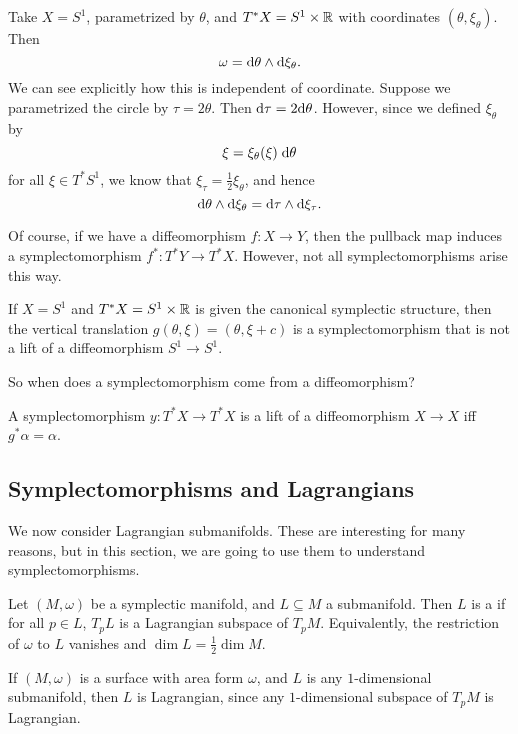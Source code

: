 \documentclass[a4paper]{article}
\begin{document}
\begin{eg}
  Take $X = S^1$, parametrized by $\theta$, and $T^* X = S^1 \times \mathbb{R}$ with coordinates $(\theta, \xi_\theta)$. Then
  \[
    \omega = \mathrm{d} \theta \wedge \mathrm{d} \xi_\theta.
  \]
  We can see explicitly how this is independent of coordinate. Suppose we parametrized the circle by $\tau = 2 \theta$. Then $\mathrm{d} \tau = 2 \mathrm{d} \theta$. However, since we defined $\xi_\theta$ by
  \[
    \xi = \xi_\theta(\xi) \;\mathrm{d} \theta
  \]
  for all $\xi \in T^* S^1$, we know that $\xi_\tau = \frac{1}{2} \xi_\theta$, and hence
  \[
    \mathrm{d} \theta \wedge \mathrm{d} \xi_\theta = \mathrm{d} \tau \wedge \mathrm{d} \xi_\tau.
  \]
\end{eg}

Of course, if we have a diffeomorphism $f: X \to Y$, then the pullback map induces a symplectomorphism $f^*: T^*Y \to T^*X$. However, not all symplectomorphisms arise this way.
\begin{eg}
  If $X = S^1$ and $T^* X = S^1 \times \mathbb{R}$ is given the canonical symplectic structure, then the vertical translation $g(\theta, \xi) = (\theta, \xi + c)$ is a symplectomorphism that is not a lift of a diffeomorphism $S^1 \to S^1$.
\end{eg}

So when does a symplectomorphism come from a diffeomorphism?

\begin{ex}
  A symplectomorphism $y: T^* X \to T^* X$ is a lift of a diffeomorphism $X \to X$ iff $g^* \alpha = \alpha$.
\end{ex}

\subsection{Symplectomorphisms and Lagrangians}
We now consider Lagrangian submanifolds. These are interesting for many reasons, but in this section, we are going to use them to understand symplectomorphisms.
\begin{defi}
  Let $(M, \omega)$ be a symplectic manifold, and $L \subseteq M$ a submanifold. Then $L$ is a  if for all $p \in L$, $T_p L$ is a Lagrangian subspace of $T_p M$. Equivalently, the restriction of $\omega$ to $L$ vanishes and $\dim L = \frac{1}{2} \dim M$.
\end{defi}

\begin{eg}
  If $(M, \omega)$ is a surface with area form $\omega$, and $L$ is any $1$-dimensional submanifold, then $L$ is Lagrangian, since any $1$-dimensional subspace of $T_p M$ is Lagrangian.
\end{eg}
\end{document}
